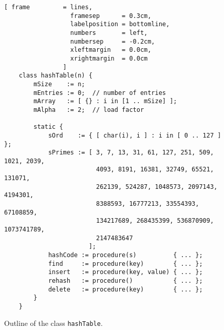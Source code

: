\begin{figure}[!ht]
  \centering
\begin{Verbatim}[ frame         = lines, 
                  framesep      = 0.3cm, 
                  labelposition = bottomline,
                  numbers       = left,
                  numbersep     = -0.2cm,
                  xleftmargin   = 0.0cm,
                  xrightmargin  = 0.0cm
                ]
    class hashTable(n) {
        mSize    := n;
        mEntries := 0;  // number of entries
        mArray   := [ {} : i in [1 .. mSize] ];
        mAlpha   := 2;  // load factor
    
        static {
            sOrd    := { [ char(i), i ] : i in [ 0 .. 127 ] };
            sPrimes := [ 3, 7, 13, 31, 61, 127, 251, 509, 1021, 2039, 
                         4093, 8191, 16381, 32749, 65521, 131071, 
                         262139, 524287, 1048573, 2097143, 4194301, 
                         8388593, 16777213, 33554393, 67108859, 
                         134217689, 268435399, 536870909, 1073741789, 
                         2147483647 
                       ];    
            hashCode := procedure(s)          { ... };
            find     := procedure(key)        { ... };
            insert   := procedure(key, value) { ... };
            rehash   := procedure()           { ... };
            delete   := procedure(key)        { ... };    
        }
    }
\end{Verbatim}
\vspace*{-0.3cm}
  \caption{Outline of the class \texttt{hashTable}.}
  \label{fig:hashTable.stlx-outline}
\end{figure}

